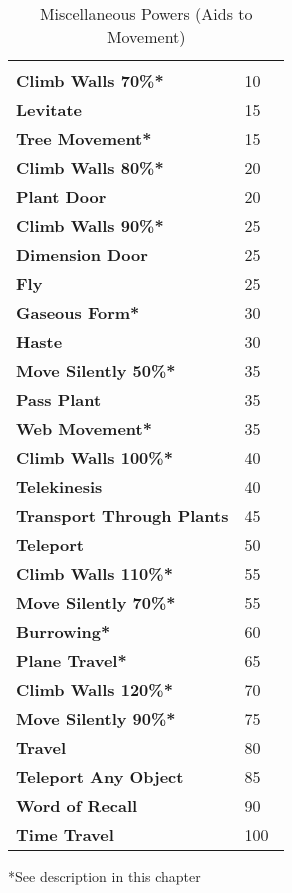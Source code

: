 \begin{multicols*}{2}
\begin {table}[H]
  \caption{Miscellaneous Powers (Aids to Movement)}
  \begin{tabularx}{\columnwidth}{>{\bfseries}YY}
   & \\
	Climb Walls 70\%* & 10\\
	Levitate & 15\\
	Tree Movement* & 15\\
	Climb Walls 80\%* & 20\\
	Plant Door & 20\\
	Climb Walls 90\%* & 25\\
	Dimension Door & 25\\
	Fly & 25\\
	Gaseous Form* & 30\\
	Haste & 30\\
	Move Silently 50\%* & 35\\
	Pass Plant & 35\\
	Web Movement* & 35\\
	Climb Walls 100\%* & 40\\
	Telekinesis & 40\\
	Transport Through Plants & 45\\
	Teleport & 50\\
	Climb Walls 110\%* & 55\\
	Move Silently 70\%* & 55\\
	Burrowing* & 60\\
	Plane Travel* & 65\\
	Climb Walls 120\%* & 70\\
	Move Silently 90\%* & 75\\
	Travel & 80\\
	Teleport Any Object & 85\\
	Word of Recall & 90\\
	Time Travel & 100\
  \end {tabularx}
	*See description in this chapter
\end {table}


\end{multicols*}
